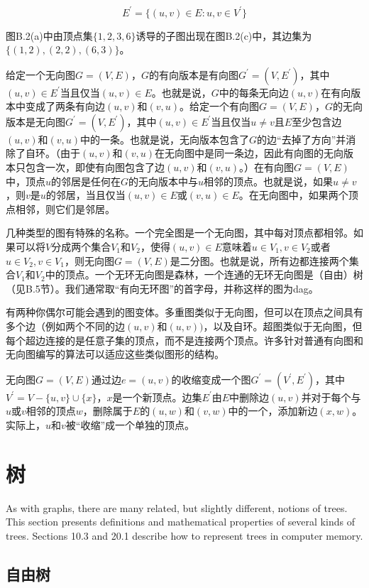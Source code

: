 \documentclass[lang=cn,newtx,10pt,scheme=chinese]{elegantbook}
\begin{document}
$$
E^{\prime}=\{(u, v) \in E: u, v \in V^{\prime}\}
$$

图B.2(a)中由顶点集$\{1,2,3,6\}$诱导的子图出现在图B.2(c)中，其边集为$\{(1,2),(2,2),(6,3)\}$。

给定一个无向图$G=(V,E)$，$G$的有向版本是有向图$G^{\prime}=(V,E^{\prime})$，其中$(u,v)\in E^{\prime}$当且仅当$(u,v)\in E$。也就是说，$G$中的每条无向边$(u,v)$在有向版本中变成了两条有向边$(u,v)$和$(v,u)$。给定一个有向图$G=(V,E)$，$G$的无向版本是无向图$G^{\prime}=(V,E^{\prime})$，其中$(u,v)\in E^{\prime}$当且仅当$u\neq v$且$E$至少包含边$(u,v)$和$(v,u)$中的一条。也就是说，无向版本包含了$G$的边“去掉了方向”并消除了自环。（由于$(u,v)$和$(v,u)$在无向图中是同一条边，因此有向图的无向版本只包含一次，即使有向图包含了边$(u,v)$和$(v,u)$。）在有向图$G=(V,E)$中，顶点$u$的邻居是任何在$G$的无向版本中与$u$相邻的顶点。也就是说，如果$u\neq v$，则$v$是$u$的邻居，当且仅当$(u,v)\in E$或$(v,u)\in E$。在无向图中，如果两个顶点相邻，则它们是邻居。

几种类型的图有特殊的名称。一个完全图是一个无向图，其中每对顶点都相邻。如果可以将$V$分成两个集合$V_1$和$V_2$，使得$(u,v)\in E$意味着$u\in V_1,v\in V_2$或者$u\in V_2,v\in V_1$，则无向图$G=(V,E)$是二分图。也就是说，所有边都连接两个集合$V_1$和$V_2$中的顶点。一个无环无向图是森林，一个连通的无环无向图是（自由）树（见B.5节）。我们通常取“有向无环图”的首字母，并称这样的图为dag。

有两种你偶尔可能会遇到的图变体。多重图类似于无向图，但可以在顶点之间具有多个边（例如两个不同的边$(u,v)$和$(u,v))$，以及自环。超图类似于无向图，但每个超边连接的是任意子集的顶点，而不是连接两个顶点。许多针对普通有向图和无向图编写的算法可以适应这些类似图形的结构。

无向图$G=(V,E)$通过边$e=(u,v)$的收缩变成一个图$G^{\prime}=(V^{\prime},E^{\prime})$，其中$V^{\prime}=V-\{u,v\}\cup\{x\}$，$x$是一个新顶点。边集$E^{\prime}$由$E$中删除边$(u,v)$并对于每个与$u$或$v$相邻的顶点$w$，删除属于$E$的$(u,w)$和$(v,w)$中的一个，添加新边$(x,w)$。实际上，$u$和$v$被“收缩”成一个单独的顶点。

\section{树}

As with graphs, there are many related, but slightly different, notions of trees. This section presents definitions and mathematical properties of several kinds of trees. Sections 10.3 and 20.1 describe how to represent trees in computer memory.

\subsection{自由树}
\end{document}
